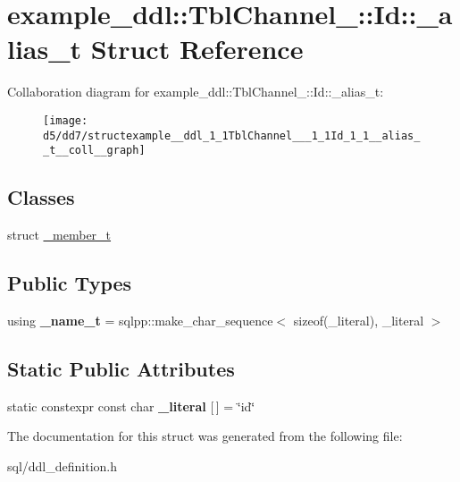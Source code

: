 \hypertarget{structexample__ddl_1_1TblChannel___1_1Id_1_1__alias__t}{}\section{example\+\_\+ddl\+:\+:Tbl\+Channel\+\_\+\+:\+:Id\+:\+:\+\_\+alias\+\_\+t Struct Reference}
\label{structexample__ddl_1_1TblChannel___1_1Id_1_1__alias__t}


Collaboration diagram for example\+\_\+ddl\+:\+:Tbl\+Channel\+\_\+\+:\+:Id\+:\+:\+\_\+alias\+\_\+t\+:
\nopagebreak
\begin{figure}[H]
\begin{center}
\leavevmode
\texttt{[image: d5/dd7/structexample\_\_ddl\_1\_1TblChannel\_\_\_1\_1Id\_1\_1\_\_alias\_\_t\_\_coll\_\_graph]}
\end{center}
\end{figure}
\subsection*{Classes}
\begin{DoxyCompactItemize}
\item 
struct \hyperlink{structexample__ddl_1_1TblChannel___1_1Id_1_1__alias__t_1_1__member__t}{\+\_\+member\+\_\+t}
\end{DoxyCompactItemize}
\subsection*{Public Types}
\begin{DoxyCompactItemize}
\item 
\hypertarget{structexample__ddl_1_1TblChannel___1_1Id_1_1__alias__t_a68a0d44b49336d9c2ca47bf19130499a}{}using {\bfseries \+\_\+name\+\_\+t} = sqlpp\+::make\+\_\+char\+\_\+sequence$<$ sizeof(\+\_\+literal), \+\_\+literal $>$\label{structexample__ddl_1_1TblChannel___1_1Id_1_1__alias__t_a68a0d44b49336d9c2ca47bf19130499a}

\end{DoxyCompactItemize}
\subsection*{Static Public Attributes}
\begin{DoxyCompactItemize}
\item 
\hypertarget{structexample__ddl_1_1TblChannel___1_1Id_1_1__alias__t_a9b803b1669315f5cee505200eaf35e23}{}static constexpr const char {\bfseries \+\_\+literal} \mbox{[}$\,$\mbox{]} = \char`\"{}id\char`\"{}\label{structexample__ddl_1_1TblChannel___1_1Id_1_1__alias__t_a9b803b1669315f5cee505200eaf35e23}

\end{DoxyCompactItemize}


The documentation for this struct was generated from the following file\+:\begin{DoxyCompactItemize}
\item 
sql/ddl\+\_\+definition.\+h\end{DoxyCompactItemize}
